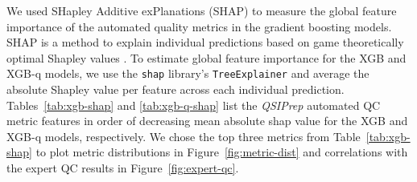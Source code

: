 \documentclass[fleqn,10pt,inline]{wlscirep}
\begin{document}
We used SHapley Additive exPlanations (SHAP) to measure the global feature importance of the automated quality metrics in the gradient boosting models.
SHAP is a method to explain individual predictions based on game theoretically optimal Shapley values \cite{lundberg2017unified}. To estimate global feature importance for the XGB and XGB-q models, we use the \texttt{shap} library's \texttt{TreeExplainer} \cite{lundberg2020local} and average the absolute Shapley value per feature across each individual prediction. Tables~\ref{tab:xgb-shap} and \ref{tab:xgb-q-shap} list the \emph{QSIPrep} automated QC metric features in order of decreasing mean absolute shap value for the XGB and XGB-q models, respectively. We chose the top three metrics from Table~\ref{tab:xgb-shap} to plot metric distributions in Figure~\ref{fig:metric-dist} and correlations with the expert QC results in Figure~\ref{fig:expert-qc}.
\end{document}
